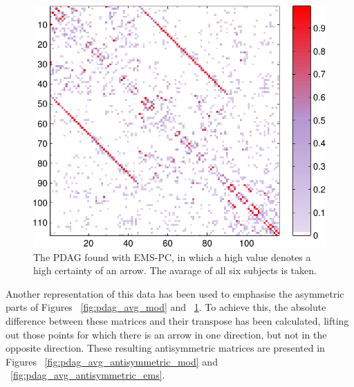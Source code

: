 \documentclass[a4paper, 10pt, english, onecolumn]{article}
\begin{document}
\begin{figure}[h!]
  \centering
  \includegraphics{images/PDAG_avg_colored_expl}
  \caption{The PDAG found with EMS-PC, in which a high value denotes a high certainty of an arrow. The avarage of all six subjects is taken.}
  \label{fig:pdag_avg_ems}
\end{figure}

Another representation of this data has been used to emphasise the asymmetric parts of Figures ~\ref{fig:pdag_avg_mod} and ~\ref{fig:pdag_avg_ems}.
To achieve this, the absolute difference between these matrices and their transpose has been calculated, lifting out those points for which there is an arrow in one direction, but not in the opposite direction.
These resulting antisymmetric matrices are presented in Figures ~\ref{fig:pdag_avg_antisymmetric_mod} and ~\ref{fig:pdag_avg_antisymmetric_ems}.
\end{document}

